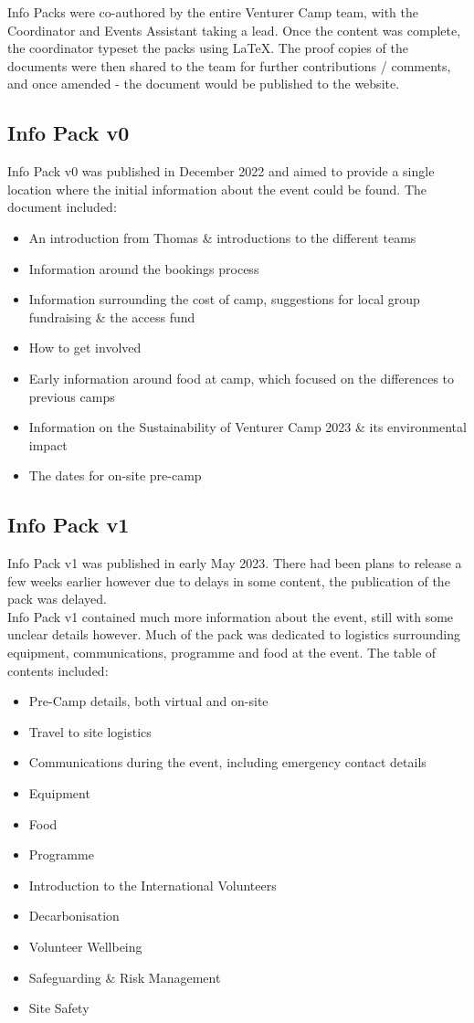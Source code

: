 Info Packs were co-authored by the entire Venturer Camp team, with the Coordinator and Events Assistant taking a lead. Once the content was complete, the coordinator typeset the packs using \LaTeX. The proof copies of the documents were then shared to the team for further contributions / comments, and once amended - the document would be published to the website. 

\subsection{Info Pack v0}
Info Pack v0 was published in December 2022 and aimed to provide a single location where the initial information about the event could be found. The document included:
\begin{itemize}
    \item An introduction from Thomas \& introductions to the different teams
    \item Information around the bookings process
    \item Information surrounding the cost of camp, suggestions for local group fundraising \& the access fund
    \item How to get involved
    \item Early information around food at camp, which focused on the differences to previous camps
    \item Information on the Sustainability of Venturer Camp 2023 \& its environmental impact
    \item The dates for on-site pre-camp
\end{itemize}

\subsection{Info Pack v1}
Info Pack v1 was published in early May 2023. There had been plans to release a few weeks earlier however due to delays in some content, the publication of the pack was delayed. \\

Info Pack v1 contained much more information about the event, still with some unclear details however. Much of the pack was dedicated to logistics surrounding equipment, communications, programme and food at the event. The table of contents included:
\begin{itemize}
    \item Pre-Camp details, both virtual and on-site
    \item Travel to site logistics
    \item Communications during the event, including emergency contact details
    \item Equipment
    \item Food
    \item Programme
    \item Introduction to the International Volunteers
    \item Decarbonisation
    \item Volunteer Wellbeing
    \item Safeguarding \& Risk Management
    \item Site Safety
\end{itemize}

